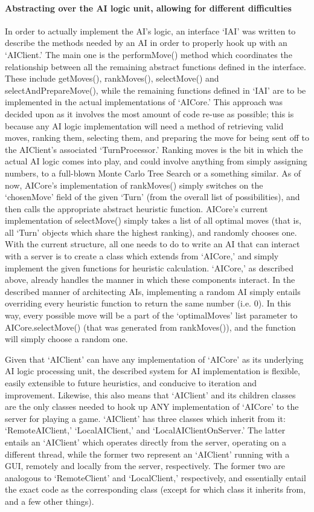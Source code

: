 \documentclass[a4paper,doc,draftfirst]{apa6}
\begin{document}
\paragraph{Abstracting over the AI logic unit, allowing for different difficulties}
In order to actually implement the AI’s logic, an interface ‘IAI’ was written to describe the methods needed by an AI in order to properly hook up with an ‘AIClient.’ The main one is the performMove() method which coordinates the relationship between all the remaining abstract functions defined in the interface. These include getMoves(), rankMoves(), selectMove() and selectAndPrepareMove(), while the remaining functions defined in ‘IAI’ are to be implemented in the actual implementations of ‘AICore.’ This approach was decided upon as it involves the most amount of code re-use as possible; this is because any AI logic implementation will need a method of retrieving valid moves, ranking them, selecting them, and preparing the move for being sent off to the AIClient’s associated ‘TurnProcessor.’ Ranking moves is the bit in which the actual AI logic comes into play, and could involve anything from simply assigning numbers, to a full-blown Monte Carlo Tree Search or a something similar. As of now, AICore’s implementation of rankMoves() simply switches on the ‘chosenMove’ field of the given ‘Turn’  (from the overall list of possibilities), and then calls the appropriate abstract heuristic function. AICore’s current implementation of selectMove() simply takes a list of all optimal moves (that is, all ‘Turn’ objects which share the highest ranking), and randomly chooses one. With the current structure, all one needs to do to write an AI that can interact with a server is to create a class which extends from ‘AICore,’ and simply implement the given functions for heuristic calculation. ‘AICore,’ as described above, already handles the manner in which these components interact. In the described manner of architecting AIs, implementing a random AI simply entails overriding every heuristic function to return the same number (i.e. 0). In this way, every possible move will be a part of the ‘optimalMoves’ list parameter to AICore.selectMove() (that was generated from rankMoves()), and the function will simply choose a random one.

Given that ‘AIClient’ can have any implementation of ‘AICore’ as its underlying AI logic processing unit, the described system for AI implementation is flexible, easily extensible to future heuristics, and conducive to iteration and improvement. Likewise, this also means that ‘AIClient’ and its children classes are the only classes needed to hook up ANY implementation of ‘AICore’ to the server for playing a game. ‘AIClient’ has three classes which inherit from it: ‘RemoteAIClient,’ ‘LocalAIClient,’ and ‘LocalAIClientOnServer.’ The latter entails an ‘AIClient’ which operates directly from the server, operating on a different thread, while the former two represent an ‘AIClient’ running with a GUI, remotely and locally from the server, respectively. The former two are analogous to ‘RemoteClient’ and ‘LocalClient,’ respectively, and essentially entail the exact code as the corresponding class (except for which class it inherits from, and a few other things).
\end{document}
